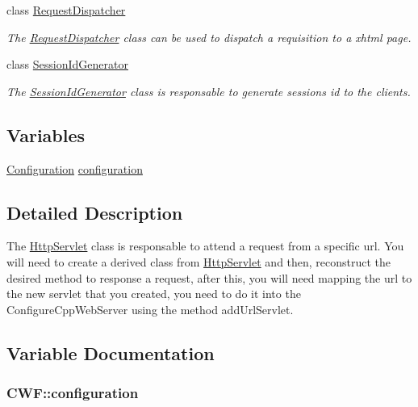 \begin{DoxyCompactItemize}
class \hyperlink{class_c_w_f_1_1_request_dispatcher}{Request\+Dispatcher}
\begin{DoxyCompactList}\small\item\em The \hyperlink{class_c_w_f_1_1_request_dispatcher}{Request\+Dispatcher} class can be used to dispatch a requisition to a xhtml page. \end{DoxyCompactList}\item 
class \hyperlink{class_c_w_f_1_1_session_id_generator}{Session\+Id\+Generator}
\begin{DoxyCompactList}\small\item\em The \hyperlink{class_c_w_f_1_1_session_id_generator}{Session\+Id\+Generator} class is responsable to generate sessions id to the clients. \end{DoxyCompactList}\end{DoxyCompactItemize}
\subsection*{Variables}
\begin{DoxyCompactItemize}
\item 
\hyperlink{class_c_w_f_1_1_configuration}{Configuration} \hyperlink{namespace_c_w_f_a2f275195c5c69646f7df4e917febe552}{configuration}
\end{DoxyCompactItemize}


\subsection{Detailed Description}
The \hyperlink{class_c_w_f_1_1_http_servlet}{Http\+Servlet} class is responsable to attend a request from a specific url. You will need to create a derived class from \hyperlink{class_c_w_f_1_1_http_servlet}{Http\+Servlet} and then, reconstruct the desired method to response a request, after this, you will need mapping the url to the new servlet that you created, you need to do it into the Configure\+Cpp\+Web\+Server using the method add\+Url\+Servlet. 

\subsection{Variable Documentation}
\hypertarget{namespace_c_w_f_a2f275195c5c69646f7df4e917febe552}{
\subsubsection[{configuration}]{ C\+W\+F\+::configuration}}\label{namespace_c_w_f_a2f275195c5c69646f7df4e917febe552}
